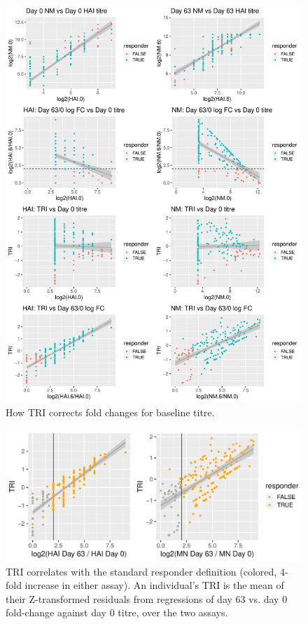 \begin{figure}
    \includegraphics[width=1.0\textwidth]{./mainmatter/figures/chapter_02/phenotype_data_setup.tri_comparison.pdf}
    \caption{How TRI corrects fold changes for baseline titre.}
    \label{fig:tri_vs_fc}
\end{figure} 

\begin{figure}
    \includegraphics[width=1.0\textwidth]{./mainmatter/figures/chapter_02/phenotype_data_setup.tri_comparison_ASHG.pdf}
    \caption{TRI correlates with the standard responder definition (colored, 4-fold increase in either assay). An individual's TRI is the mean of their Z-transformed residuals from regressions of day 63 vs. day 0 fold-change against day 0 titre, over the two assays.}
    \label{fig:tri_vs_responder}
\end{figure}

